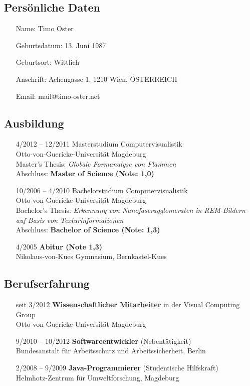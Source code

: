 \documentclass[oneside]{scrartcl}
\author{Timo Oster}
\date{26. April 2019}
\begin{document}
%
%
\subsection*{Persönliche Daten}
%
\begin{enumerate}
    \item[Name:] Timo Oster
    \item[Geburtsdatum:] 13. Juni 1987
    \item[Geburtsort:] Wittlich
    \item[Anschrift:] Achengasse 1, 1210 Wien, ÖSTERREICH
    \item[Email:] mail@timo-oster.net
\end{enumerate}
%
\subsection*{Ausbildung}
%
\begin{enumerate}
    \item[4/2012 -- 12/2011] Masterstudium Computervisualistik\\
                   Otto-von-Guericke-Universität Magdeburg\\
                   Master's Thesis: \emph{Globale Formanalyse von Flammen}\\
                   Abschluss: \textbf{Master of Science (Note: 1,0)}
    \item[10/2006 -- 4/2010] Bachelorstudium Computervisualistik\\
                             Otto-von-Guericke-Universität Magdeburg\\
                             Bachelor's Thesis: \emph{Erkennung von Nanofaseragglomeraten in REM-Bildern auf Basis von Texturinformationen}\\
                             Abschluss: \textbf{Bachelor of Science (Note: 1,3)}
    \item[4/2005] \textbf{Abitur (Note 1,3)}\\
                  Nikolaus-von-Kues Gymnasium, Bernkastel-Kues
\end{enumerate}
%
\subsection*{Berufserfahrung}
%
\begin{enumerate}
    \item[seit 3/2012] \textbf{Wissenschaftlicher Mitarbeiter} in der Visual Computing Group\\
                       Otto-von-Guericke-Universität Magdeburg
    \item[9/2010 -- 10/2012] \textbf{Softwareentwickler} (Nebentätigkeit)\\
                             Bundesanstalt für Arbeitsschutz und Arbeitssicherheit, Berlin
    \item[2/2008 -- 9/2009] \textbf{Java-Programmierer} (Studentische Hilfskraft)\\
                            Helmhotz-Zentrum für Umweltforschung, Magdeburg
\end{enumerate}
%
\end{document}
